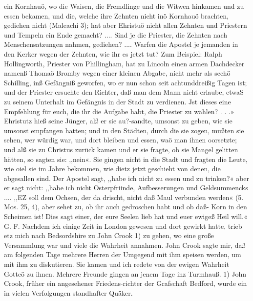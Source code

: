 ein Kornhauö, wo die Waisen, die Fremdlinge und die Witwen
hinkamen und zu essen bekamen, und die, welche ihre Zehnten
nicht inö Kornhauö brachten, gediehen nicht (Maleachi 3); hat
aber Ehristuö nicht allen Zehnten und Priestern und Tempeln
ein Ende gemacht? .... Sind je die Priester, die Zehnten nach
Menschensatzungen nahmen, gediehen? .... Warfen die Apostel
je jemanden in den Kerker wegen der Zehnten, wie ihr es jetzt tut?
Zum Beispiel: Ralph Hollingworth, Priester von Phillingham,
hat zu Lincoln einen armen Dachdecker namenß Thomaö Bromby
wegen einer kleinen Abgabe, nicht mehr als sechö Schilling, inß
Gefängniß geworfen, wo er nun schon seit achtunddreißig Tagen
ist; und der Priester ersuchte den Richter, daß man dem Mann
nicht erlaube, etwaS zu seinem Unterhalt im Gefängnis in der
Stadt zu verdienen. Jst dieses eine Empfehlung für euch, die ihr
die Aufgabe habt, die Priester zu wählen? . . .» Ehristutz hieß
seine Jünger, alß er sie au?-sandte, umsonst zu geben, wie sie
umsonst empfangen hatten; und in den Städten, durch die sie
zogen, mußten sie sehen, wer würdig war, und dort bleiben und
essen, waö man ihnen oorsetzte; und alß sie zu Christus zurück
kamen und er sie fragte, ob sie Mangel gelitten hätten, so sagten
sie: ,,nein«. Sie gingen nicht in die Stadt und fragten die
Leute, wie oiel sie im Jahre bekommen, wie dietz jetzt geschieht
von denen, die abgesallen sind. Der Apostel sagt, ,,habe ich
nicht zu essen und zu trinken?« aber er sagt nicht: ,,habe ich nicht
Osterpfriinde, Aufbesserungen und Geldsummencks .... ,,EZ soll
dem Ochsen, der da drischt, nicht daß Maul verbunden werden«
(5. Mos. 25, 4), aber sehet zu, ob ihr auch gedroschen habt und
ob daß- Korn in den Scheimen ist! Dies sagt einer, der eure
Seelen lieb hat und euer ewigeß Heil will.« G. F.
Nachdem ich einige Zeit in London gewesen und dort gewirkt
hatte, trieb etz mich nach Bedsordshire zu John Crook 1) zu gehen,
wo eine große Versammlung war und viele die Wahrheit annahmen.
John Crook sagte mir, daß am folgenden Tage mehrere Herren
der Umgegend mit ihm speisen werden, um mit ihm zu diskutieren.
Sie kamen und ich redete von der ewigen Wahrheit Gotteö zu
ihnen. Mehrere Freunde gingen an jenem Tage inz Turmhauß.
1) John Crook, früher ein angesehener Friedens-richter der Grafschaft
Bedford, wurde ein in vielen Verfolgungen standhafter Quäker.


